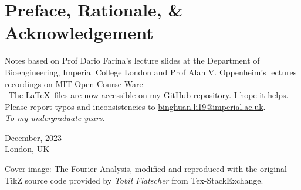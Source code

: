 \section*{Preface, Rationale, \& Acknowledgement}
Notes based on Prof Dario Farina's lecture slides at the Department of Bioengineering, Imperial College London and Prof Alan V. Oppenheim's lectures recordings on MIT Open Course Ware\\


\faGithub \ The \LaTeX \ files are now accessible on my \href{https://github.com/binghuan-li/Notes-and-Formula-Sheets}{GitHub repository}. I hope it helps. Please report typos and inconsistencies to \href{mailto:binghuan.li19@imperial.ac.uk}{binghuan.li19@imperial.ac.uk}. \\

\textit{To my undergraduate years.}

\begin{flushright}
December, 2023\\
London, UK
\end{flushright}

\vfill
{\color{gray}
Cover image: The Fourier Analysis, modified and reproduced with the original TikZ source code provided by \textit{Tobit Flatscher} from Tex-StackExchange.
}